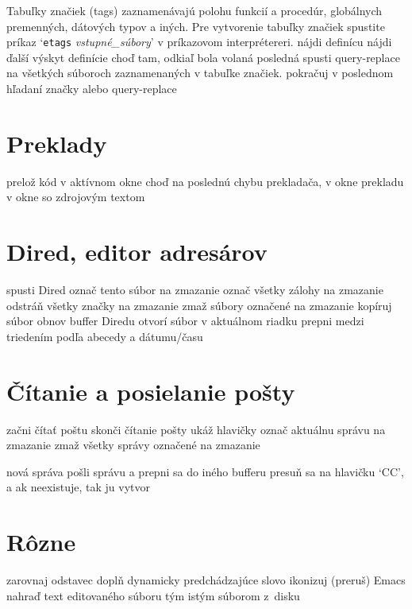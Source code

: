 Tabuľky značiek (tags) zaznamenávajú polohu funkcií a procedúr, globálnych
premenných, dátových typov a iných. Pre vytvorenie tabuľky značiek spustite
príkaz `{\tt etags} {\it vstupné\_súbory}' v príkazovom interprétereri.
\askip
{} nájdi definícu
 nájdi ďalší výskyt definície
 choď tam, odkiaľ bola volaná posledná 
 spusti query-replace na všetkých súboroch
zaznamenaných v tabuľke značiek.
 pokračuj v poslednom hľadaní značky alebo query-replace

\section{Preklady}

 prelož kód v aktívnom okne
 choď na poslednú chybu prekladača, v okne prekladu
 v okne so zdrojovým textom

\section{Dired, editor adresárov}

 spusti Dired
 označ tento súbor na zmazanie
\key{\~{}} označ všetky zálohy na zmazanie
 odstráň všetky značky na zmazanie
 zmaž súbory označené na zmazanie
 kopíruj súbor
 obnov buffer Diredu
 otvorí súbor v aktuálnom riadku
 prepni medzi triedením podľa abecedy a dátumu/času

\section{Čítanie a posielanie pošty}

 začni čítať poštu
 skonči čítanie pošty
 ukáž hlavičky
 označ aktuálnu správu na zmazanie
 zmaž všetky správy označené na zmazanie

 nová správa
 pošli správu a prepni sa do iného bufferu
 presuň sa na hlavičku `CC', a ak neexistuje, tak ju
vytvor

\section{Rôzne}

 zarovnaj odstavec
 doplň dynamicky predchádzajúce slovo
 ikonizuj (preruš) Emacs
 nahraď text editovaného súboru tým istým súborom z~disku

